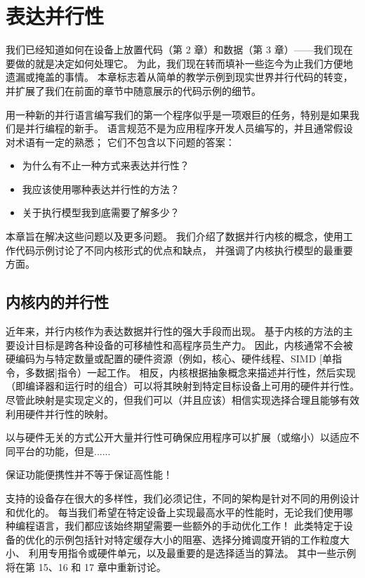 \section{表达并行性}
我们已经知道如何在设备上放置代码（第 2 章）和数据（第 3 章）——我们现在要做的就是决定如何处理它。 
为此，我们现在转而填补一些迄今为止我们方便地遗漏或掩盖的事情。 
本章标志着从简单的教学示例到现实世界并行代码的转变，并扩展了我们在前面的章节中随意展示的代码示例的细节。

用一种新的并行语言编写我们的第一个程序似乎是一项艰巨的任务，特别是如果我们是并行编程的新手。 
语言规范不是为应用程序开发人员编写的，并且通常假设对术语有一定的熟悉； 它们不包含以下问题的答案：

\begin{itemize}
	\item 为什么有不止一种方式来表达并行性？

	\item 我应该使用哪种表达并行性的方法？

	\item 关于执行模型我到底需要了解多少？
\end{itemize}

本章旨在解决这些问题以及更多问题。 我们介绍了数据并行内核的概念，使用工作代码示例讨论了不同内核形式的优点和缺点，
并强调了内核执行模型的最重要方面。

\subsection{内核内的并行性}
近年来，并行内核作为表达数据并行性的强大手段而出现。 基于内核的方法的主要设计目标是跨各种设备的可移植性和高程序员生产力。 
因此，内核通常不会被硬编码为与特定数量或配置的硬件资源（例如，核心、硬件线程、SIMD [单指令，多数据]指令）一起工作。 
相反，内核根据抽象概念来描述并行性，然后实现（即编译器和运行时的组合）可以将其映射到特定目标设备上可用的硬件并行性。 
尽管此映射是实现定义的，但我们可以（并且应该）相信实现选择合理且能够有效利用硬件并行性的映射。

以与硬件无关的方式公开大量并行性可确保应用程序可以扩展（或缩小）以适应不同平台的功能，但是......

\begin{remark}
	保证功能便携性并不等于保证高性能！
\end{remark}

支持的设备存在很大的多样性，我们必须记住，不同的架构是针对不同的用例设计和优化的。 
每当我们希望在特定设备上实现最高水平的性能时，无论我们使用哪种编程语言，我们都应该始终期望需要一些额外的手动优化工作！ 
此类特定于设备的优化的示例包括针对特定缓存大小的阻塞、选择分摊调度开销的工作粒度大小、
利用专用指令或硬件单元，以及最重要的是选择适当的算法。 其中一些示例将在第 15、16 和 17 章中重新讨论。

